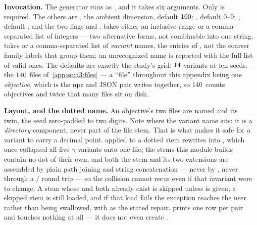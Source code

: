 \label{app:so:a3:cli}

\textbf{Invocation.} The generator runs as
, and it takes six arguments. Only
 is required. The others are
, the ambient dimension, default $100$;
, default $0$--$9$;
, default ; and the two flags
 and . 
takes either an inclusive  range or a comma-separated list of
integers --- two alternative forms, not combinable into one string.
 takes  or a comma-separated list of
\emph{variant} names, the entries of , not the coarser
family labels that group them; an unrecognized name is reported with the full
list of valid ones. The defaults are exactly the study's grid: $14$
variants at ten seeds, the $140$ files of~\ref{app:so:a3:files} --- a
``file'' throughout this appendix being one \emph{objective}, which is the npz
and JSON pair  writes together, so $140$ counts objectives
and twice that many files sit on disk.

\textbf{Layout, and the dotted name.} An objective's two files are named
and its  twin, the seed zero-padded to two digits. Note where the variant name sits: it is a
\emph{directory} component, never part of the file stem. That is what makes it
safe for a variant to carry a decimal point.
 applied to a dotted stem rewrites
 into , which once
collapsed all five $\gamma$ variants onto one file; the stems this module
builds contain no dot of their own, and both the stem and its two
extensions are assembled by plain path joining and string concatenation ---
never by , never through a /
round trip --- so the collision cannot recur even if that invariant were to
change. A stem whose  and  both already exist is
skipped unless  is given; a skipped stem is still loaded, and
if that load fails the exception reaches the user rather than being swallowed,
with  as the stated repair.  prints one
row per  pair and touches nothing at all --- it does not
even create .

